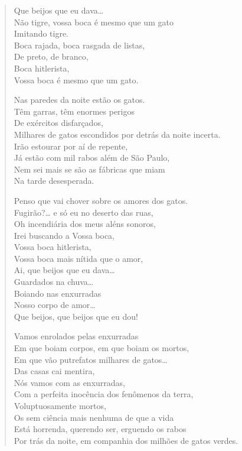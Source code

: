 \begin{verse}
Que beijos que eu dava\ldots{}\\
Não tigre, vossa boca é mesmo que um gato\\
Imitando tigre.\\
Boca rajada, boca rasgada de listas,\\
De preto, de branco,\\
Boca hitlerista,\\
Vossa boca é mesmo que um gato.

Nas paredes da noite estão os gatos.\\
Têm garras, têm enormes perigos\\
De exércitos disfarçados,\\
Milhares de gatos escondidos por detrás da noite incerta.\\
Irão estourar por aí de repente,\\
Já estão com mil rabos além de São Paulo,\\
Nem sei mais se são as fábricas que miam\\
Na tarde desesperada.

Penso que vai chover sobre os amores dos gatos.\\
Fugirão?\ldots{} e só eu no deserto das ruas,\\
Oh incendiária dos meus aléns sonoros,\\
Irei buscando a Vossa boca,\\
Vossa boca hitlerista,\\
Vossa boca mais nítida que o amor,\\
Ai, que beijos que eu dava\ldots{}\\
Guardados na chuva\ldots{}\\
Boiando nas enxurradas\\
Nosso corpo de amor\ldots{}\\
Que beijos, que beijos que eu dou!

Vamos enrolados pelas enxurradas\\
Em que boiam corpos, em que boiam os mortos,\\
Em que vão putrefatos milhares de gatos\ldots{}\\
Das casas cai mentira,\\
Nós vamos com as enxurradas,\\
Com a perfeita inocência dos fenômenos da terra,\\
Voluptuosamente mortos,\\
Os sem ciência mais nenhuma de que a vida\\
Está horrenda, querendo ser, erguendo os rabos\\
Por trás da noite, em companhia dos milhões de gatos verdes.
\end{verse}

